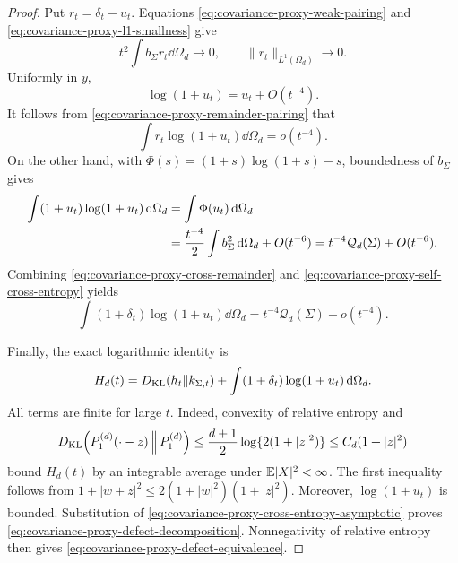 \begin{proof}
Put \(r_t=\delta_t-u_t\).  Equations
\eqref{eq:covariance-proxy-weak-pairing} and
\eqref{eq:covariance-proxy-l1-smallness} give
\begin{equation}\label{eq:covariance-proxy-remainder-pairing}
 t^2\int b_\Sigma r_t\dd\Omega_d\longrightarrow0,
 \qquad \|r_t\|_{L^1(\Omega_d)}\longrightarrow0.
\end{equation}
Uniformly in \(y\),
\[
 \log(1+u_t)=u_t+O(t^{-4}).
\]
It follows from \eqref{eq:covariance-proxy-remainder-pairing} that
\begin{equation}\label{eq:covariance-proxy-cross-remainder}
 \int r_t\log(1+u_t)\dd\Omega_d=o(t^{-4}).
\end{equation}
On the other hand, with
\(\Phi(s)=(1+s)\log(1+s)-s\), boundedness of \(b_\Sigma\) gives
\begin{align}
 \int(1+u_t)\log(1+u_t)\,\mathrm{d}\Omega_d
 &=\int\Phi(u_t)\,\mathrm{d}\Omega_d \notag\\
 &=\frac{t^{-4}}2\int b_\Sigma^2\,\mathrm{d}\Omega_d+O(t^{-6})
 =t^{-4}\mathcal Q_d(\Sigma)+O(t^{-6}).
 \label{eq:covariance-proxy-self-cross-entropy}
\end{align}
Combining \eqref{eq:covariance-proxy-cross-remainder} and
\eqref{eq:covariance-proxy-self-cross-entropy} yields
\begin{equation}\label{eq:covariance-proxy-cross-entropy-asymptotic}
 \int(1+\delta_t)\log(1+u_t)\dd\Omega_d
 =t^{-4}\mathcal Q_d(\Sigma)+o(t^{-4}).
\end{equation}

Finally, the exact logarithmic identity is
\[
 H_d(t)=D_{\rm KL}(h_t\|k_{\Sigma,t})
 +\int(1+\delta_t)\log(1+u_t)\,\mathrm{d}\Omega_d.
\]
 All terms are finite for large \(t\).  Indeed, convexity of relative entropy
 and
 \[
  D_{\rm KL}\!\left(P_1^{(d)}(\mathord\cdot-z)\,\middle\|\,
  P_1^{(d)}\right)
  \le \frac{d+1}{2}\log\{2(1+|z|^2)\}
  \le C_d(1+|z|^2)
 \]
 bound \(H_d(t)\) by an integrable average under
 \(\mathbb{E}|X|^2<\infty\).  The first inequality follows from
 \(1+|w+z|^2\le2(1+|w|^2)(1+|z|^2)\).  Moreover,
 \(\log(1+u_t)\) is bounded.  Substitution of
\eqref{eq:covariance-proxy-cross-entropy-asymptotic} proves
\eqref{eq:covariance-proxy-defect-decomposition}.  Nonnegativity of relative
entropy then gives \eqref{eq:covariance-proxy-defect-equivalence}.
\end{proof}


